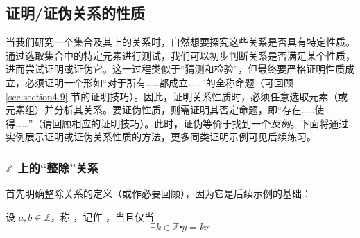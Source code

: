 
\subsection{证明/证伪关系的性质}

当我们研究一个集合及其上的关系时，自然想要探究这些关系是否具有特定性质。通过选取集合中的特定元素进行测试，我们可以初步判断关系是否满足某个性质，进而尝试证明或证伪它。这一过程类似于``猜测和检验''，但最终要严格证明性质成立，必须证明一个形如``对于所有……都成立……''的全称命题（可回顾 \ref{sec:section4.9} 节的证明技巧）。因此，证明关系性质时，必须任意选取元素（或元素组）并分析其关系。要证伪性质，则需证明其否定命题，即``存在……使得……''（请回顾相应的证明技巧）。此时，证伪等价于找到一个\emph{反例}。下面将通过实例展示证明或证伪关系性质的方法，更多同类证明示例可见后续练习。

\subsubsection*{$\mathbb{Z}$ 上的``整除''关系}

首先明确整除关系的定义（或作必要回顾），因为它是后续示例的基础：

\begin{definition}\label{def:definition6.2.15}
    设 $a,b \in \mathbb{Z}$，称 ，记作 ，当且仅当
    \[\exists k \in \mathbb{Z} \centerdot y = kx\]
\end{definition}

